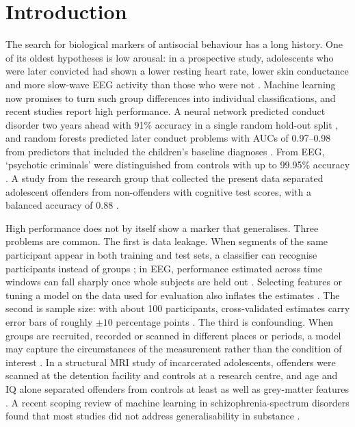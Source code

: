 
\section{Introduction}
\label{sec:intro}

The search for biological markers of antisocial behaviour has a long history. One of its oldest hypotheses is low arousal: in a prospective study, adolescents who were later convicted had shown a lower resting heart rate, lower skin conductance and more slow-wave EEG activity than those who were not \cite{Raine1990}. Machine learning now promises to turn such group differences into individual classifications, and recent studies report high performance. A neural network predicted conduct disorder two years ahead with 91\% accuracy in a single random hold-out split \cite{Chan2023}, and random forests predicted later conduct problems with AUCs of 0.97--0.98 from predictors that included the children's baseline diagnoses \cite{Berluti2026}. From EEG, `psychotic criminals' were distinguished from controls with up to 99.95\% accuracy \cite{Tasci2025}. A study from the research group that collected the present data separated adolescent offenders from non-offenders with cognitive test scores, with a balanced accuracy of 0.88 \cite{Bonfante2023}.

High performance does not by itself show a marker that generalises. Three problems are common. The first is data leakage. When segments of the same participant appear in both training and test sets, a classifier can recognise participants instead of groups \cite{Saeb2017,Brookshire2024}; in EEG, performance estimated across time windows can fall sharply once whole subjects are held out \cite{Gil2026}. Selecting features or tuning a model on the data used for evaluation also inflates the estimates \cite{Varma2006,Cawley2010,Kapoor2023}. The second is sample size: with about 100 participants, cross-validated estimates carry error bars of roughly $\pm 10$ percentage points \cite{Varoquaux2018}. The third is confounding. When groups are recruited, recorded or scanned in different places or periods, a model may capture the circumstances of the measurement rather than the condition of interest \cite{Chyzhyk2022}. In a structural MRI study of incarcerated adolescents, offenders were scanned at the detention facility and controls at a research centre, and age and IQ alone separated offenders from controls at least as well as grey-matter features \cite{Steele2017}. A recent scoping review of machine learning in schizophrenia-spectrum disorders found that most studies did not address generalisability in substance \cite{Rivera2026}.

